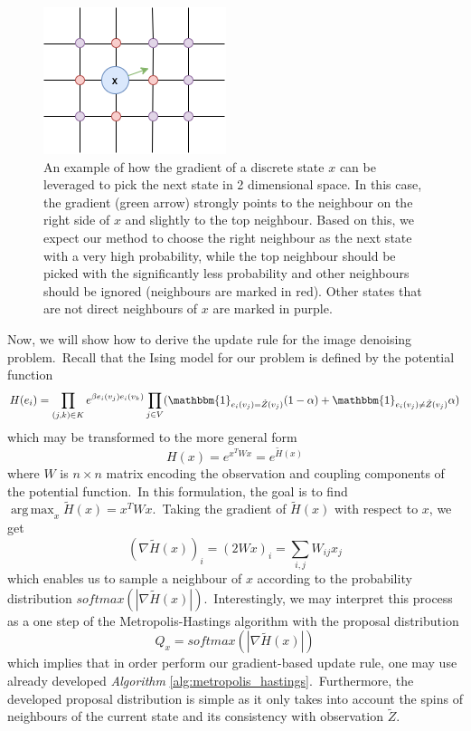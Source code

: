 \documentclass[shortabstract, english, lic]{iithesis}
\DeclareMathOperator*{\argmax}{arg\,max}
\theoremstyle{default_theorem_style}\newtheorem{theorem}{Theorem}
\theoremstyle{default_theorem_style}\newtheorem{definition}{Definition}
\begin{document}
\begin{figure}[t]
\centering
\includegraphics[scale=0.8]{gradient_example}
\caption{An example of how the gradient of a discrete state $x$ can be leveraged to pick the next state in 2
dimensional space. In this case, the gradient (green arrow) strongly points to the neighbour on the right side
of $x$ and slightly to the top neighbour. Based on this, we expect our method to choose the right neighbour as the
next state with a very high probability, while the top neighbour should be picked with the significantly less
probability and other neighbours should be ignored (neighbours are marked in red). Other states that are not direct
neighbours of $x$ are marked in purple.}
\label{fig:gradient_example}
\end{figure}

\noindent Now, we will show how to derive the update rule for the image denoising problem.\ Recall that the Ising model
for our problem is defined by the potential function
$$
H(e_i) = \prod\limits_{(j, k) \in K} e^{\beta e_i(v_j)e_i(v_k)}
\prod\limits_{j \in V}( \mathbbm{1}_{e_i(v_j) = \tilde{Z}(v_j)}(1 - \alpha) +
\mathbbm{1}_{e_i(v_j) \neq \tilde{Z}(v_j)}\alpha)
$$
which may be transformed to the more general form
$$
H(x) = e^{x^T W x} = e^{\tilde{H}(x)}
$$
where $W$ is $n \times n$ matrix encoding the observation and coupling components of the potential function.\ In
this formulation, the goal is to find $\argmax_x \tilde{H}(x) = x^T W x$.\ Taking the gradient of
$\tilde{H}(x)$ with respect to $x$, we get
$$
(\nabla \tilde{H}(x))_i = (2W x)_i = \sum_{i, j} W_{ij} x_j
$$
which enables us to sample a neighbour of $x$ according to the probability distribution
$softmax(|\nabla \tilde{H}(x)|)$.\ Interestingly, we may interpret this process as a one step of the
Metropolis-Hastings algorithm with the proposal distribution
$$
Q_x = softmax(|\nabla \tilde{H}(x)|)
$$
which implies that in order perform our gradient-based update rule, one may use already developed
\textit{Algorithm} \ref{alg:metropolis_hastings}.\ Furthermore, the developed proposal distribution is simple as
it only takes into account the spins of neighbours of the current state and its consistency with observation
$\tilde{Z}$.
\end{document}
